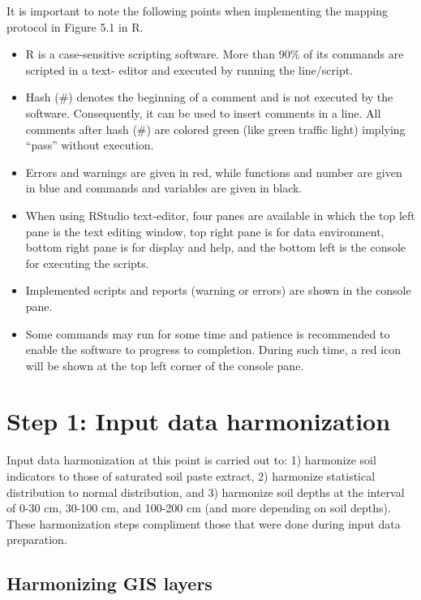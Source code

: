 \documentclass[
  10pt,
  b5paper,
]{book}
\providecommand{\tightlist}{%
  \setlength{\itemsep}{0pt}\setlength{\parskip}{0pt}}
\begin{document}
It is important to note the following points when implementing the mapping protocol in Figure 5.1 in R.

\begin{itemize}
\tightlist
\item
  R is a case-sensitive scripting software. More than 90\% of its commands are scripted in a text- editor and executed by running the line/script.
\item
  Hash (\#) denotes the beginning of a comment and is not executed by the software. Consequently, it can be used to insert comments in a line. All comments after hash (\#) are colored green (like green traffic light) implying ``pass'' without execution.
\item
  Errors and warnings are given in red, while functions and number are given in blue and commands and variables are given in black.
\item
  When using RStudio text-editor, four panes are available in which the top left pane is the text editing window, top right pane is for data environment, bottom right pane is for display and help, and the bottom left is the console for executing the scripts.
\item
  Implemented scripts and reports (warning or errors) are shown in the console pane.
\item
  Some commands may run for some time and patience is recommended to enable the software to progress to completion. During such time, a red icon will be shown at the top left corner of the console pane.
\end{itemize}

\hypertarget{step-1-input-data-harmonization}{%
\section{Step 1: Input data harmonization}\label{step-1-input-data-harmonization}}

Input data harmonization at this point is carried out to: 1) harmonize soil indicators to those of saturated soil paste extract, 2) harmonize statistical distribution to normal distribution, and 3) harmonize soil depths at the interval of 0-30 cm, 30-100 cm, and 100-200 cm (and more depending on soil depths). These harmonization steps compliment those that were done during input data preparation.

\hypertarget{harmonizing-gis-layers}{%
\subsection{Harmonizing GIS layers}\label{harmonizing-gis-layers}}
\end{document}
